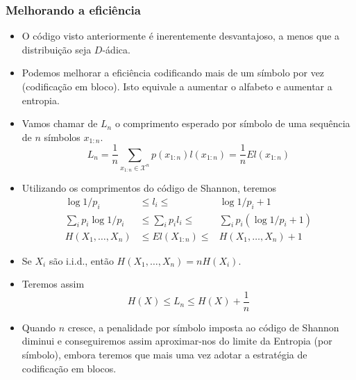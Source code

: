 \begin{frame}[allowframebreaks]
  \frametitle{Melhorando a eficiência}
  \begin{itemize}
  \item O código visto anteriormente é inerentemente desvantajoso, a menos que a distribuição seja $D$-ádica.
  \item Podemos melhorar a eficiência codificando mais de um símbolo por vez (codificação em bloco). Isto
	equivale a aumentar o alfabeto e aumentar a entropia.
  \item Vamos chamar de $L_n$ o comprimento esperado por símbolo de uma sequência de $n$ símbolos $x_{1:n}$.
	\begin{equation}
	L_n = \frac{1}{n} \sum_{x_{1:n} \in \mathcal{X}^n} p(x_{1:n}) l(x_{1:n}) = \frac{1}{n} E l(x_{1:n})
	\end{equation}
  \item Utilizando os comprimentos do código de Shannon, teremos
	\begin{eqnarray}
	\log 1/p_i & \leq l_i \leq & \log 1/p_i + 1 \nonumber \\
	\sum_i p_i \log 1/p_i & \leq \sum_i p_i l_i \leq & \sum_i p_i \left( \log 1/p_i + 1 \right) \nonumber \\
	H(X_1,\ldots,X_n) & \leq E l(X_{1:n}) \leq & H(X_1,\ldots,X_n) + 1
	\end{eqnarray}
  \item Se $X_i$ são i.i.d., então $H(X_1,\ldots,X_n) = nH(X_i)$.
  \item Teremos assim
	\begin{equation}
	H(X) \leq L_n \leq H(X) + \frac{1}{n}
	\end{equation}
  \item Quando $n$ cresce, a penalidade por símbolo imposta ao código de Shannon diminui e 
	conseguiremos assim aproximar-nos do limite da Entropia (por símbolo), embora teremos que
	mais uma vez adotar a estratégia de codificação em blocos.
  \end{itemize}
\end{frame}

